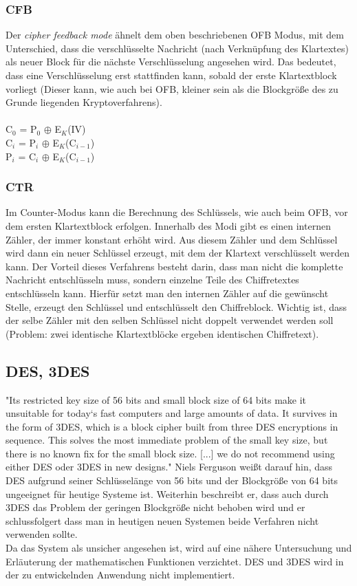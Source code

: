 \documentclass[10pt, a4paper,headsepline]{scrreprt}
\begin{document}
\subsubsection{CFB}
Der \textit{cipher feedback mode} ähnelt dem oben beschriebenen OFB Modus, mit dem Unterschied, dass die verschlüsselte Nachricht (nach Verknüpfung des Klartextes) als neuer Block für die nächste Verschlüsselung angesehen wird. Das bedeutet, dass eine Verschlüsselung erst stattfinden kann, sobald der erste Klartextblock vorliegt (Dieser kann, wie auch bei OFB, kleiner sein als die Blockgröße des zu Grunde liegenden Kryptoverfahrens).  \citep[S. 235ff]{book:angewandte-krypto} \\ \\
C$_{0}$ = P$_{0}$ $\oplus$ E$_{K}$(IV) \\
C$_{i}$ = P$_{i}$ $\oplus$ E$_{K}$(C$_{i-1}$) \\
P$_{i}$ = C$_{i}$ $\oplus$ E$_{K}$(C$_{i-1}$) \\

\subsubsection{CTR}
Im Counter-Modus kann die Berechnung des Schlüssels, wie auch beim OFB, vor dem ersten Klartextblock erfolgen. Innerhalb des Modi gibt es einen internen Zähler, der immer konstant erhöht wird. Aus diesem Zähler und dem Schlüssel wird dann ein neuer Schlüssel erzeugt, mit dem der Klartext verschlüsselt werden kann. Der Vorteil dieses Verfahrens besteht darin, dass man nicht die komplette Nachricht entschlüsseln muss, sondern einzelne Teile des Chiffretextes entschlüsseln kann. Hierfür setzt man den internen Zähler auf die gewünscht Stelle, erzeugt den Schlüssel und entschlüsselt den Chiffreblock. Wichtig ist, dass der selbe Zähler mit den selben Schlüssel nicht doppelt verwendet werden soll (Problem: zwei identische Klartextblöcke ergeben identischen Chiffretext). \citep[S. 243]{book:angewandte-krypto}

\subsection{DES, 3DES}
"Its restricted key size of 56 bits and small block size of 64 bits make it unsuitable for today`s fast computers and large amounts of data. It survives in the form of 3DES, which is a block cipher built from three DES encryptions in sequence. This solves the most immediate problem of the small key size, but there is no known fix for the small block size. [...] we do not recommend using either DES oder 3DES in new designs." \citep[S. 51]{book:practical-crypto}
Niels Ferguson weißt darauf hin, dass DES aufgrund seiner Schlüsselänge von 56 bits und der Blockgröße von 64 bits ungeeignet für heutige Systeme ist. Weiterhin beschreibt er, dass auch durch 3DES das Problem der geringen Blockgröße nicht behoben wird und er schlussfolgert dass man in heutigen neuen Systemen beide Verfahren nicht verwenden sollte. \\
Da das System als unsicher angesehen ist, wird auf eine nähere Untersuchung und Erläuterung der mathematischen Funktionen verzichtet. DES und 3DES wird in der zu entwickelnden Anwendung nicht implementiert.
\end{document}
